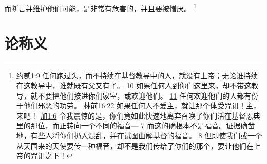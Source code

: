 \documentclass[12pt, a4paper, oneside]{ctexart}
\begin{document}
	而断言并维护他们可能，是非常有危害的，并且要被憎厌。
	\footnote {
		\href{https://biblehub.com/2_john/1-9.htm}{约贰1:9} 任何跑过头，而不持续在基督教导中的人，就没有上帝；无论谁持续在这教导中，谁就既有父又有子。
		\href{https://biblehub.com/2_john/1-10.htm}{10} 如果任何人到你们这里来，却不带这教导，就不要把他们接进你们家室，或欢迎他们。
		\href{https://biblehub.com/2_john/1-11.htm}{11} 任何欢迎他们的人都有份于他们邪恶的功劳。
		\href{https://biblehub.com/1_corinthians/16-22.htm}{林前16:22} 如果任何人不爱主，就让那个体受咒诅！主，来吧！
		\href{https://biblehub.com/galatians/1-6.htm}{加1:6} 令我震惊的是，你们竟如此快速地离弃召唤了你们活在基督恩典里的那位，而正转向一个不同的福音---
		\href{https://biblehub.com/galatians/1-7.htm}{7} 而这的确根本不是福音。证据确凿地，有些人将你们扔入混乱，并在试图曲解基督的福音。
		\href{https://biblehub.com/galatians/1-8.htm}{8} 但即使我们或一个从天国来的天使要传一种福音，却不是我们传给了你们的那个，要让他们在上帝的咒诅之下！
	}

\section{论称义}
\end{document}
